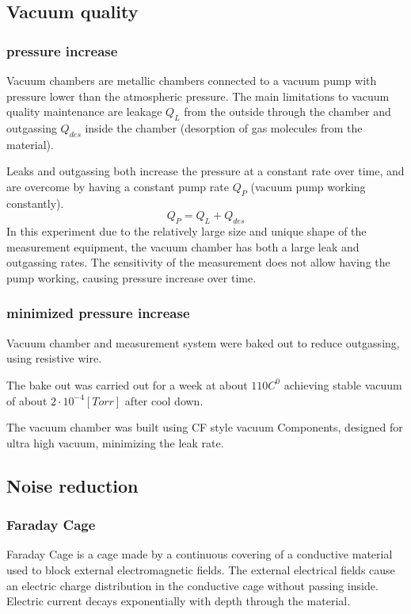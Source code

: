 \documentclass[\main/master.tex]{subfiles}
\begin{document}
\subsection{Vacuum quality}
\subsubsection{pressure increase}
\par\noindent
Vacuum chambers are metallic chambers connected to a vacuum pump with pressure lower than the atmospheric pressure. The main limitations to vacuum quality maintenance are leakage $Q_L$ from the outside through the chamber and outgassing $Q_{des}$ inside the chamber (desorption of gas molecules from the material).
\par\noindent
Leaks and outgassing both increase the pressure at a constant rate over time, and are overcome by having a constant pump rate $Q_P$ (vacuum pump working constantly).   
\begin{equation}
Q_P = Q_L + Q_{des}  \label{eqn:vacuum_equilibrium}
\end{equation}
In this experiment due to the relatively large size and unique shape of the measurement equipment, the vacuum chamber has both a large leak and outgassing rates. The sensitivity of the measurement does not allow having the pump working, causing pressure increase over time.
\subsubsection{minimized pressure increase}
\par\noindent
Vacuum chamber and measurement system were baked out to reduce outgassing, using resistive wire. 
\par\noindent
The bake out was carried out for a week at about $110 C^0$ achieving stable vacuum of about $2\cdot 10^{−4} [Torr]$ after cool down.
\par\noindent
The vacuum chamber was built using CF style vacuum Components, designed for ultra high vacuum, minimizing the leak rate.


\subsection{Noise reduction}
\subsubsection{Faraday Cage}
\par\noindent
Faraday Cage is a cage made by a continuous covering of a conductive material used to block external electromagnetic fields. The external electrical fields cause an electric charge distribution in the conductive cage without passing inside. Electric current decays exponentially with depth through the material.
\end{document}
